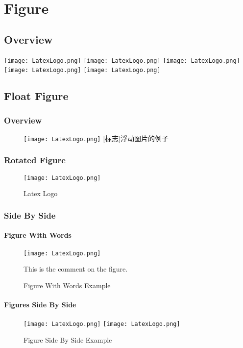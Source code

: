 \section{Figure}
\subsection{Overview}
\texttt{[image: LatexLogo.png]}
\texttt{[image: LatexLogo.png]}
\texttt{[image: LatexLogo.png]}
\texttt{[image: LatexLogo.png]}
\texttt{[image: LatexLogo.png]}

\subsection{Float Figure}
\subsubsection{Overview}
\begin{figure}[!htbp]
    \centering
    \texttt{[image: LatexLogo.png]}
    [标志]{浮动图片的例子}
\end{figure}

\subsubsection{Rotated Figure}
\begin{sidewaysfigure}
    \centering
    \texttt{[image: LatexLogo.png]}
    \caption{Latex Logo}
\end{sidewaysfigure}

\subsubsection{Side By Side}
\paragraph{Figure With Words}
\begin{figure}[H]
    \centering
    \texttt{[image: LatexLogo.png]}
    \qquad
    \parbox[b]{0.4\textwidth}{This is the comment on the figure.}
    \caption{Figure With Words Example}
\end{figure}

\paragraph{Figures Side By Side}
\begin{figure}[H]
    \centering
    \texttt{[image: LatexLogo.png]}
    \qquad
    \texttt{[image: LatexLogo.png]}
    \caption{Figure Side By Side Example}
\end{figure}

